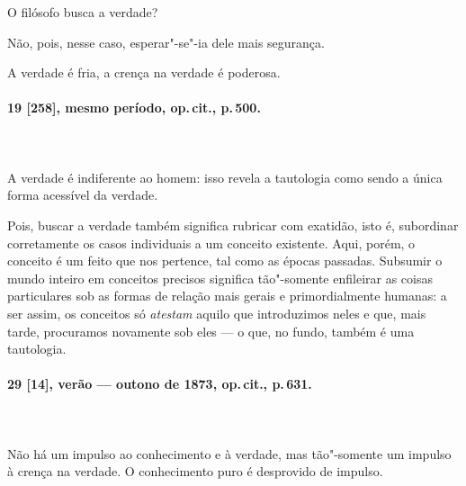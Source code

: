 O filósofo busca a verdade?

Não, pois, nesse caso, esperar"-se"-ia dele mais segurança.

A verdade é fria, a crença na verdade é poderosa.

\pagebreak
\paragraph*{19 [258], mesmo período, op.\,cit., p.\,500.}
\ \\
\ \\

A verdade é indiferente ao homem: isso revela a tautologia como sendo a
única forma acessível da verdade.

Pois, buscar a verdade também significa rubricar com exatidão, isto é,
subordinar corretamente os casos individuais a um conceito existente.
Aqui, porém, o conceito é um feito que nos pertence, tal como as épocas
passadas. Subsumir o mundo inteiro em conceitos precisos significa
tão"-somente enfileirar as coisas particulares sob as formas de relação
mais gerais e primordialmente humanas: a ser assim, os conceitos só
\textit{atestam} aquilo que introduzimos neles e que, mais tarde,
procuramos novamente sob eles --- o que, no fundo, também é uma
tautologia.

\pagebreak
\paragraph*{29 [14], verão --- outono de 1873, op.\,cit., p.\,631.}
\ \\
\ \\
Não há um impulso ao conhecimento e à verdade, mas tão"-somente um
impulso à crença na verdade. O conhecimento puro é desprovido de
impulso.
